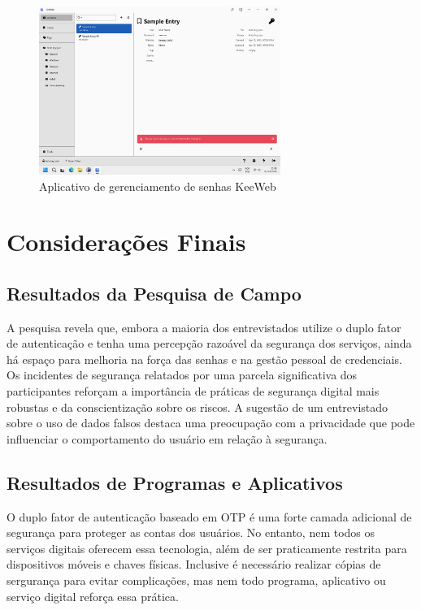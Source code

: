 \documentclass[12pt]{article}
\begin{document}
\begin{figure}[h!]
  \centering
  \includegraphics[width=0.7\textwidth]{./assets/keeweb.png}
  \caption{Aplicativo de gerenciamento de senhas KeeWeb}
  \label{fig:KeeWeb}
\end{figure}

\section{Considerações Finais}

\subsection{Resultados da Pesquisa de Campo}

A pesquisa revela que, embora a maioria dos entrevistados utilize o duplo fator de
autenticação e tenha uma percepção razoável da segurança dos serviços, ainda há
espaço para melhoria na força das senhas e na gestão pessoal de credenciais.
Os incidentes de segurança relatados por uma parcela significativa dos participantes
reforçam a importância de práticas de segurança digital mais robustas e da
conscientização sobre os riscos.
A sugestão de um entrevistado sobre o uso de dados falsos destaca uma preocupação
com a privacidade que pode influenciar o comportamento do usuário em relação à
segurança.

\subsection{Resultados de Programas e Aplicativos}

O duplo fator de autenticação baseado em OTP é uma forte camada adicional de segurança para
proteger as contas dos usuários.
No entanto, nem todos os serviços digitais oferecem essa tecnologia, além de ser praticamente
restrita para dispositivos móveis e chaves físicas.
Inclusive é necessário realizar cópias de sergurança para evitar complicações, mas nem todo
programa, aplicativo ou serviço digital reforça essa prática.
\end{document}
